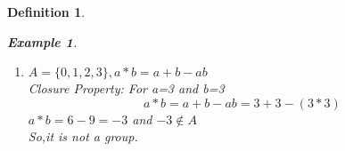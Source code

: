 \documentclass{article}
\newcommand\tab[1][3cm]{\hspace*{#1}}
\newtheorem{defn}{Definition} [section]
\newtheorem{ex}{Example}[section]
\begin{document}
\begin{defn}
\begin{ex}
\begin{enumerate}
	\\Identity Property: $$a+0=0+a=a, \forall a \in N$$
	\\Inverse Property: $$ \ a + \ (-a\ ) =\ (-a\ ) + a = 0 , \forall a \in R, but except for a = 0, -a \notin N $$
	\\So, The set of natural numbers under addition is not a group beause it does not have the inverse property .\\
	\item $A=\{0,1,2,3\}, a*b=a+b-ab$
	\\Closure Property: For a=3 and b=3
	\\ $$ a*b=a+b-ab = 3+3-(3*3) $$
    \tab	$a*b= 6-9 = -3$ and $-3 \notin A$ 
    \\So,it is not a group.
\end{enumerate}
\end{ex}
\end{defn}
\end{document}
